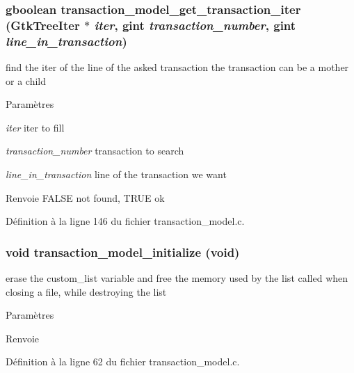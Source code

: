 \subsubsection[{transaction\_\-model\_\-get\_\-transaction\_\-iter}]{\setlength{\rightskip}{0pt plus 5cm}gboolean transaction\_\-model\_\-get\_\-transaction\_\-iter (GtkTreeIter $\ast$ {\em iter}, \/  gint {\em transaction\_\-number}, \/  gint {\em line\_\-in\_\-transaction})}\label{transaction__model_8c_af10137737c1d42087c8fed2fa2d8c9ee}
find the iter of the line of the asked transaction the transaction can be a mother or a child


\begin{DoxyParams}{Paramètres}
\item[{\em iter}]iter to fill \item[{\em transaction\_\-number}]transaction to search \item[{\em line\_\-in\_\-transaction}]line of the transaction we want\end{DoxyParams}
\begin{DoxyReturn}{Renvoie}
FALSE not found, TRUE ok 
\end{DoxyReturn}


Définition à la ligne 146 du fichier transaction\_\-model.c.

\subsubsection[{transaction\_\-model\_\-initialize}]{\setlength{\rightskip}{0pt plus 5cm}void transaction\_\-model\_\-initialize (void)}\label{transaction__model_8c_ad2a7f1004a5b27450f8fc159f74351dc}
erase the custom\_\-list variable and free the memory used by the list called when closing a file, while destroying the list


\begin{DoxyParams}{Paramètres}
\item[{\em }]\end{DoxyParams}
\begin{DoxyReturn}{Renvoie}

\end{DoxyReturn}


Définition à la ligne 62 du fichier transaction\_\-model.c.

